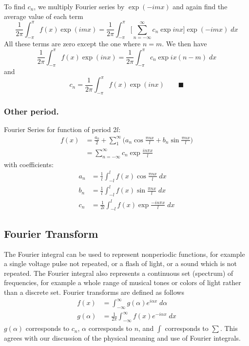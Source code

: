 \documentclass[../../../main.tex]{subfiles}
\begin{document}
To ﬁnd $c_n$, we multiply Fourier series by $\exp (-im x)$ and again ﬁnd the average value of each
term
\begin{equation*}
    \frac{1}{2\pi}\int_{-\pi}^{\pi}f(x)\exp (imx)=\frac{1}{2\pi}\int_{-\pi}^{\pi}\bigg[ \sum_{n=-\infty}^{\infty}c_n \exp{inx}\bigg]\exp (-im x) \;dx
\end{equation*}
All these terms are zero except the one where $n=m$. We then have
\begin{equation*}
    \frac{1}{2\pi}\int_{-\pi}^{\pi}f(x)\exp (inx)=\frac{1}{2\pi}\int_{-\pi}^{\pi}c_n\exp ix(n-m) \;dx
\end{equation*}
and
\begin{equation*}
    c_n=\frac{1}{2\pi}\int_{-\pi}^{\pi}f(x)\exp (inx) \qquad\blacksquare
\end{equation*}


\subsubsection{Other period.} Fourier Series for function of period $2l$:
\begin{align*}
    f(x) & =\frac{a_0}{2}+\sum_{1}^{\infty}\bigg(a_n\cos \frac{\pi nx}{l} +b_n\sin \frac{\pi nx}{l}\bigg) \\
         & =\sum_{n=-\infty}^{\infty}c_n \exp\frac{in\pi x}{l}
\end{align*}
with coefficients:
\begin{align*}
    a_n & =\frac{1}{l}\int_{-l}^{l}  f(x)\cos \frac{\pi nx}{l}\; dx   \\
    b_n & =\frac{1}{l}\int_{-l}^{l}  f(x)\sin \frac{\pi nx}{l} \;dx   \\
    c_n & =\frac{1}{2l}\int_{-l}^{l}  f(x)\exp\frac{-in\pi x}{l} \;dx
\end{align*}

\subsection{Fourier Transform}
The Fourier integral can be used to represent nonperiodic functions, for example a single voltage pulse not repeated, or a flash of light, or a sound which is not repeated. The Fourier integral also represents a continuous set (spectrum) of frequencies, for example a whole range of musical tones or colors of light rather than a discrete set. Fourier transforms are defined as follows
\begin{align*}
    f(x)      & =\int_{-\infty}^{\infty }g(\alpha)e^{i\alpha x}\;d\alpha      \\
    g(\alpha) & =\frac{1}{2\pi}\int_{-\infty}^{\infty }f(x)e^{-i\alpha x}\;dx
\end{align*}
$g(\alpha)$ corresponds to $c_n$, $\alpha$ corresponds to $n$, and $\int$ corresponds to $\sum $. This agrees with our discussion of the physical meaning and use of Fourier integrals.
\end{document}
